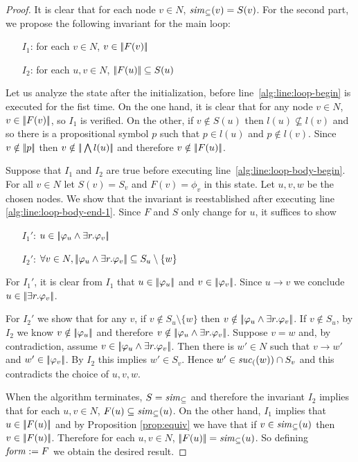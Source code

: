 \iffullversion
\begin{proof}
It is clear that for each node $v\in N$,
${\it sim}_\subseteq(v)=S(v)$. For the second part, we propose the
following invariant for the main loop:
\begin{itemize}
\item[$I_1$:] for each $v\in N$, $v \in |\!|F(v)|\!|$
\item[$I_2$:] for each $u,v\in N$, $|\!|F(u)|\!| \subseteq S(u)$
\end{itemize}
Let us analyze the state after the initialization, before line~\ref{alg:line:loop-begin} is executed for the fist time. On the one
hand, it is clear that for any node $v\in N$, $v \in |\!|F(v)|\!|$, so
$I_1$ is verified. On the other, if $v\notin S(u)$ then
$l(u)\not\subseteq l(v)$ and so there is a propositional symbol
$p$ such that $p \in l(u)$ and $p \notin l(v)$. Since $v\notin|\!|p|\!|$
then $v\notin|\!|\bigwedge l(u)|\!|$ and therefore
$v\notin |\!|F(u)|\!|$.

Suppose that $I_1$ and $I_2$ are true before executing
line~\ref{alg:line:loop-body-begin}. For all $v\in N$ let $S(v)=S_v$ and
$F(v)=\phi_v$ in this state. Let $u,v,w$ be the chosen nodes. We
show that the invariant is reestablished after executing line
\ref{alg:line:loop-body-end-1}. Since $F$ and $S$ only change for $u$,
it suffices to show
\begin{itemize}
\item[$I_1'$:] $u \in |\!|\varphi_u\wedge\exists r. \varphi_v|\!|$
\item[$I_2'$:] $\forall v\in N, |\!|\varphi_u\wedge\exists r. \varphi_v|\!| \subseteq S_u\setminus\{w\}$
\end{itemize}
For $I_1'$, it is clear from $I_1$ that $u \in |\!|\varphi_u|\!|$ and
$v \in |\!|\varphi_v|\!|$. Since $u\to v$ we conclude $u \in |\!|\exists r.
\varphi_v|\!|$.

For $I_2'$ we show that for any $v$, if $v\notin S_u\setminus\{w\}$
then $v\notin |\!|\varphi_u\wedge\exists r. \varphi_v|\!|$. If $v\notin S_u$,
by $I_2$ we know $v\notin |\!|\varphi_u|\!|$ and therefore $v\notin
|\!|\varphi_u\wedge\exists r. \varphi_v|\!|$. Suppose $v=w$ and, by
contradiction, assume $v \in |\!|\varphi_u\wedge\exists r. \varphi_v|\!|$.
Then there is $w'\in N$ such that $v\to w'$ and $w' \in
|\!|\varphi_v|\!|$. By $I_2$ this implies $w'\in S_v$. Hence
$w'\in{\it suc}_{(}(w))\cap S_v$ and this contradicts the choice of $u,v,w$.

When the algorithm terminates, $S={\it sim}_\subseteq$ and therefore
the invariant $I_2$ implies that for each $u,v\in N$,
$F(u) \subseteq {\it sim}_\subseteq(u)$. On the other hand, $I_1$
implies that $u \in |\!|F(u)|\!|$ and by Proposition \ref{prop:equiv} we
have that if $v\in {\it sim}_\subseteq(u)$ then $v \in |\!|F(u)|\!|$.
Therefore for each $u,v\in N$, $|\!|F(u)|\!| = {\it sim}_\subseteq(u)$. So defining ${\it form}:=F$ we obtain the desired result.
\end{proof}
\else
\fi


